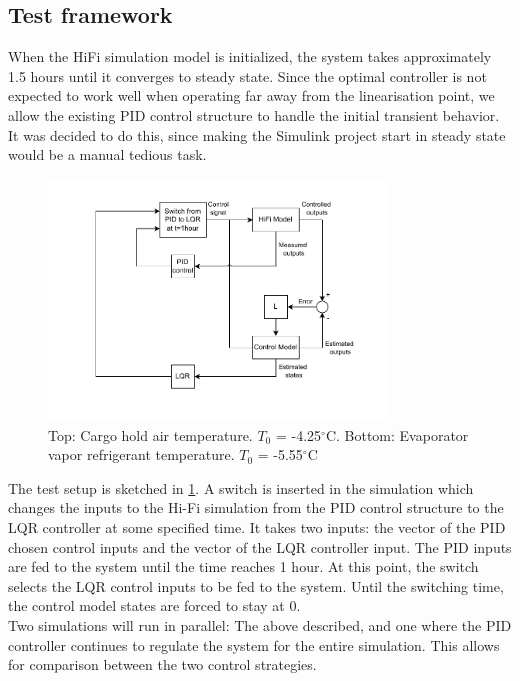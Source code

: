 \subsection{Test framework}
When the HiFi simulation model is initialized, the system takes approximately 1.5 hours until it converges to steady state. Since the optimal controller is not expected to work well when operating far away from the linearisation point, we allow the existing PID control structure to handle the initial transient behavior. It was decided to do this, since making the Simulink project start in steady state would be a manual tedious task.\\


\begin{figure}[h!]
	\centering
	\includegraphics[width=0.8\textwidth]{Graphics/HiFi_simulation_test_diagram.pdf}
	\caption{Top: Cargo hold air temperature. $T_0$ = -4.25$^{\circ}$C. Bottom: Evaporator vapor refrigerant temperature. $T_0$ = -5.55$^{\circ}$C}
	\label{fig:test_setup}
\end{figure}

The test setup is sketched in \cref{fig:test_setup}. A switch is inserted in the simulation which changes the inputs to the Hi-Fi simulation from the PID control structure to the LQR controller at some specified time. It takes two inputs: the vector of the PID chosen control inputs and the vector of the LQR controller input. The PID inputs are fed to the system until the time reaches 1 hour. At this point, the switch selects the LQR control inputs to be fed to the system. Until the switching time, the control model states are forced to stay at 0.\\

Two simulations will run in parallel: The above described, and one where the PID controller continues to regulate the system for the entire simulation. This allows for comparison between the two control strategies. \\


